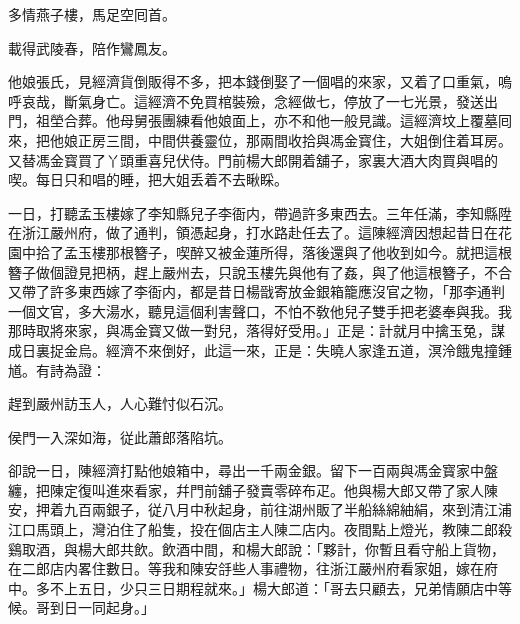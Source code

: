 \begin{myquote}
多情燕子樓，馬足空囘首。

載得武陵春，陪作鸞鳳友。
\end{myquote}

他娘張氏，見經濟貨倒販得不多，把本錢倒娶了一個唱的來家，又着了口重氣，嗚呼哀哉，斷氣身亡。這經濟不免買棺裝殮，念經做七，停放了一七光景，發送出門，祖塋合葬。他母舅張團練看他娘面上，亦不和他一般見識。這經濟坟上覆墓囘來，把他娘正房三間，中間供養靈位，那兩間收拾與馮金寳住，大姐倒住着耳房。又替馮金寳買了丫頭重喜兒伏侍。門前楊大郎開着舖子，家裏大酒大肉買與唱的喫。每日只和唱的睡，把大姐丢着不去瞅睬。

一日，打聽孟玉樓嫁了李知縣兒子李衙内，帶過許多東西去。三年任滿，李知縣陞在浙江嚴州府，做了通判，領憑起身，打水路赴任去了。這陳經濟因想起昔日在花園中拾了孟玉樓那根簪子，喫醉又被金蓮所得，落後還與了他收到如今。就把這根簪子做個證見把柄，趕上嚴州去，只說玉樓先與他有了姦，與了他這根簪子，不合又帶了許多東西嫁了李衙内，都是昔日楊戩寄放金銀箱籠應沒官之物，「那李通判一個文官，多大湯水，聽見這個利害聲口，不怕不敎他兒子雙手把老婆奉與我。我那時取將來家，與馮金寳又做一對兒，落得好受用。」正是：計就月中擒玉兔，謀成日裏捉金烏。經濟不來倒好，此這一來，正是：失曉人家逢五道，溟泠餓鬼撞鍾馗。有詩為證：

\begin{myquote}
趕到嚴州訪玉人，人心難忖似石沉。

侯門一入深如海，従此蕭郎落陷坑。
\end{myquote}

卻說一日，陳經濟打點他娘箱中，尋出一千兩金銀。留下一百兩與馮金寳家中盤纏，把陳定復叫進來看家，幷門前舖子發賣零碎布疋。他與楊大郎又帶了家人陳安，押着九百兩銀子，従八月中秋起身，前往湖州販了半船絲綿紬絹，來到清江浦江口馬頭上，灣泊住了船隻，投在個店主人陳二店内。夜間點上燈光，教陳二郎殺鷄取酒，與楊大郎共飲。飲酒中間，和楊大郎說：「夥計，你暫且看守船上貨物，在二郎店内畧住數日。等我和陳安㧱些人事禮物，往浙江嚴州府看家姐，嫁在府中。多不上五日，少只三日期程就來。」楊大郎道：「哥去只顧去，兄弟情願店中等候。哥到日一同起身。」

